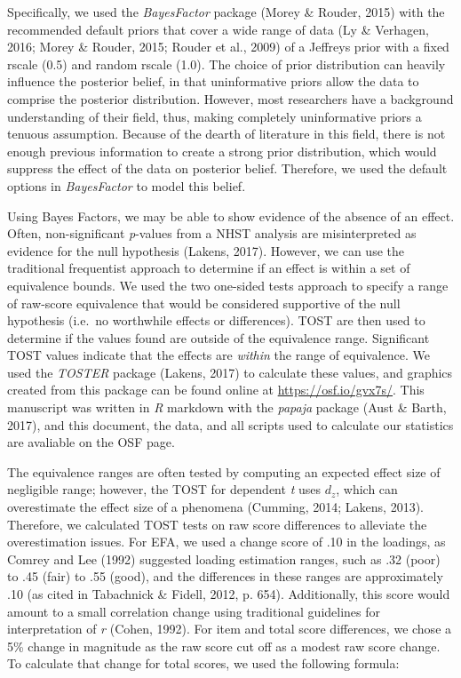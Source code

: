 \documentclass[english,man, mask]{apa6}
\theoremstyle{definition}
\theoremstyle{definition}
\theoremstyle{definition}
\theoremstyle{remark}
\begin{document}
Specifically, we used the \emph{BayesFactor} package (Morey \& Rouder,
2015) with the recommended default priors that cover a wide range of
data (Ly \& Verhagen, 2016; Morey \& Rouder, 2015; Rouder et al., 2009)
of a Jeffreys prior with a fixed rscale (0.5) and random rscale (1.0).
The choice of prior distribution can heavily influence the posterior
belief, in that uninformative priors allow the data to comprise the
posterior distribution. However, most researchers have a background
understanding of their field, thus, making completely uninformative
priors a tenuous assumption. Because of the dearth of literature in this
field, there is not enough previous information to create a strong prior
distribution, which would suppress the effect of the data on posterior
belief. Therefore, we used the default options in \emph{BayesFactor} to
model this belief.

Using Bayes Factors, we may be able to show evidence of the absence of
an effect. Often, non-significant \emph{p}-values from a NHST analysis
are misinterpreted as evidence for the null hypothesis (Lakens, 2017).
However, we can use the traditional frequentist approach to determine if
an effect is within a set of equivalence bounds. We used the two
one-sided tests approach to specify a range of raw-score equivalence
that would be considered supportive of the null hypothesis (i.e.~no
worthwhile effects or differences). TOST are then used to determine if
the values found are outside of the equivalence range. Significant TOST
values indicate that the effects are \emph{within} the range of
equivalence. We used the \emph{TOSTER} package (Lakens, 2017) to
calculate these values, and graphics created from this package can be
found online at \url{https://osf.io/gvx7s/}. This manuscript was written
in \emph{R} markdown with the \emph{papaja} package (Aust \& Barth,
2017), and this document, the data, and all scripts used to calculate
our statistics are avaliable on the OSF page.

The equivalence ranges are often tested by computing an expected effect
size of negligible range; however, the TOST for dependent \emph{t} uses
\(d_z\), which can overestimate the effect size of a phenomena (Cumming,
2014; Lakens, 2013). Therefore, we calculated TOST tests on raw score
differences to alleviate the overestimation issues. For EFA, we used a
change score of .10 in the loadings, as Comrey and Lee (1992) suggested
loading estimation ranges, such as .32 (poor) to .45 (fair) to .55
(good), and the differences in these ranges are approximately .10 (as
cited in Tabachnick \& Fidell, 2012, p. 654). Additionally, this score
would amount to a small correlation change using traditional guidelines
for interpretation of \emph{r} (Cohen, 1992). For item and total score
differences, we chose a 5\% change in magnitude as the raw score cut off
as a modest raw score change. To calculate that change for total scores,
we used the following formula:
\end{document}
